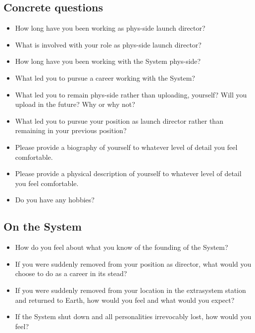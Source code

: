 \hypertarget{concrete-questions}{%
\subsection{Concrete questions}\label{concrete-questions}}

\begin{itemize}
\tightlist
\item
  How long have you been working as phys-side launch director?
\item
  What is involved with your role as phys-side launch director?
\item
  How long have you been working with the System phys-side?
\item
  What led you to pursue a career working with the System?
\item
  What led you to remain phys-side rather than uploading, yourself? Will you upload in the future? Why or why not?
\item
  What led you to pursue your position as launch director rather than remaining in your previous position?
\item
  Please provide a biography of yourself to whatever level of detail you feel comfortable.
\item
  Please provide a physical description of yourself to whatever level of detail you feel comfortable.
\item
  Do you have any hobbies?
\end{itemize}

\hypertarget{on-the-system}{%
\subsection{On the System}\label{on-the-system}}

\begin{itemize}
\tightlist
\item
  How do you feel about what you know of the founding of the System?
\item
  If you were suddenly removed from your position as director, what would you choose to do as a career in its stead?
\item
  If you were suddenly removed from your location in the extrasystem station and returned to Earth, how would you feel and what would you expect?
\item
  If the System shut down and all personalities irrevocably lost, how would you feel?
\end{itemize}

